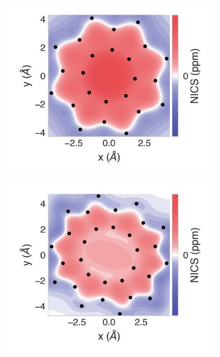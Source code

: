\documentclass[
	fontsize=10pt, %
	twoside=true, %
	numbers=noenddot, %
]{kaobook}
\begin{document}
\begin{figure}[h]
\begin{subfigure}{5.5cm}\centering\includegraphics{p08-2d}\end{subfigure}%
\begin{subfigure}{5.5cm}\centering\includegraphics{p10-2d}\end{subfigure}%

\end{figure}
\end{document}
